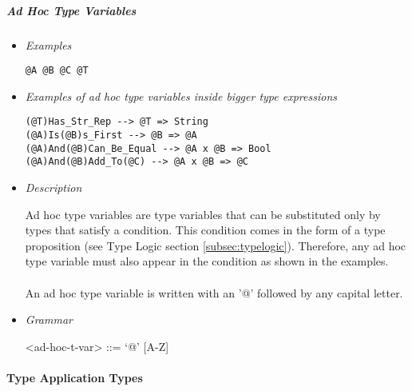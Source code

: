 \documentclass[diploma]{softlab-thesis}
\begin{document}
\subparagraph{Ad Hoc Type Variables}

\begin{itemize}
\item \textit{Examples}
\begin{verbatim}
@A @B @C @T
\end{verbatim}

\item \textit{Examples of ad hoc type variables inside bigger type expressions}
\begin{verbatim}
(@T)Has_Str_Rep --> @T => String
(@A)Is(@B)s_First --> @B => @A
(@A)And(@B)Can_Be_Equal --> @A x @B => Bool
(@A)And(@B)Add_To(@C) --> @A x @B => @C
\end{verbatim}

\item \textit{Description}

Ad hoc type variables are type variables that can be substituted only by types
that satisfy a condition. This condition comes in the form of a type
proposition (see Type Logic section \ref{subsec:typelogic}). Therefore, any ad
hoc type variable must also appear in the condition as shown in the examples.
\\\\
An ad hoc type variable is written with an '@' followed by any capital letter.

\item \textit{Grammar}
\begin{grammar}
<ad-hoc-t-var> ::= `@' [A-Z]
\end{grammar}
\end{itemize}

\paragraph{Type Application Types}
\end{document}
